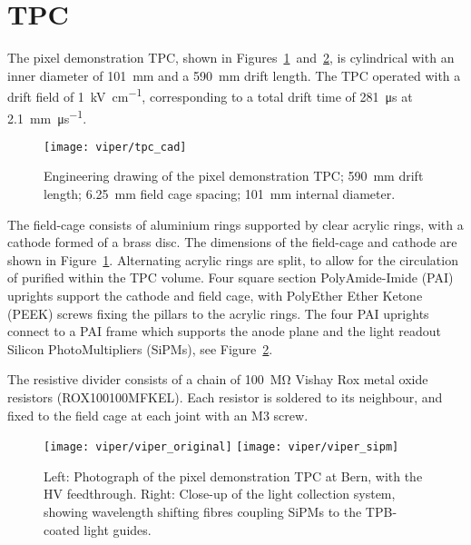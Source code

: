 \section{TPC}
\label{sec:viper_tpc}

The pixel demonstration TPC, shown in Figures~\ref{fig:viper_cad}~and~\ref{fig:viper_v1per}, is cylindrical with an inner diameter of \SI{101}{\milli\metre} and a \SI{590}{\milli\metre} drift length. 
The TPC operated with a drift field of \SI{1}{\kilo\volt\per\centi\metre}, corresponding to a total drift time of \SI{281}{\micro\second} at \SI{2.1}{\milli\metre\per\micro\second}.~\cite{protoLASER}

\begin{figure}[htb]
	\centering
	\texttt{[image: viper/tpc\_cad]}
	\caption{\small Engineering drawing of the pixel demonstration TPC; \SI{590}{\milli\metre} drift length; \SI{6.25}{\milli\metre} field cage spacing; \SI{101}{\milli\metre} internal diameter.}
	\label{fig:viper_cad}
\end{figure}
 
The field-cage consists of aluminium rings supported by clear acrylic rings, with a cathode formed of a brass disc. 
The dimensions of the field-cage and cathode are shown in Figure~\ref{fig:viper_cad}.
Alternating acrylic rings are split, to allow for the circulation of purified \lar{} within the TPC volume.
Four square section PolyAmide-Imide (PAI) uprights support the cathode and field cage, with PolyEther Ether Ketone (PEEK) screws fixing the pillars to the acrylic rings.
The four PAI uprights connect to a PAI frame which supports the anode plane and the light readout Silicon PhotoMultipliers (SiPMs), see Figure~\ref{fig:viper_v1per}.   

The resistive divider consists of a chain of \SI{100}{\mega\ohm} Vishay Rox metal oxide resistors (ROX100100MFKEL).
Each resistor is soldered to its neighbour, and fixed to the field cage at each joint with an M3 screw.   

\begin{figure}[htb]
	\centering
	\texttt{[image: viper/viper\_original]}
	\texttt{[image: viper/viper\_sipm]}
	\caption{\small  Left: Photograph of the  pixel demonstration TPC at Bern, with the HV feedthrough.
	Right: Close-up of the light collection system, showing wavelength shifting fibres coupling SiPMs to the TPB-coated light guides.}
	\label{fig:viper_v1per}
\end{figure}

